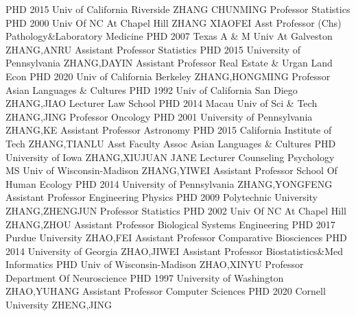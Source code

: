 \documentclass[
]{article}
\begin{document}
\textbar PHD 2015 Univ of California Riverside \textbar{} 
\textbar ZHANG CHUNMING \textbar Professor \textbar Statistics
\textbar PHD 2000 Univ Of NC At Chapel Hill \textbar{} 
\textbar ZHANG XIAOFEI \textbar Asst Professor (Chs)
\textbar Pathology\&Laboratory Medicine \textbar PHD 2007 Texas A \& M
Univ At Galveston \textbar{}  \textbar ZHANG,ANRU
\textbar Assistant Professor \textbar Statistics \textbar PHD 2015
University of Pennsylvania \textbar{}  \textbar ZHANG,DAYIN
\textbar Assistant Professor \textbar Real Estate \& Urgan Land Econ
\textbar PHD 2020 Univ of California Berkeley \textbar{} 
\textbar ZHANG,HONGMING \textbar Professor \textbar Asian Languages \&
Cultures \textbar PHD 1992 Univ of California San Diego \textbar{}
 \textbar ZHANG,JIAO \textbar Lecturer \textbar Law School
\textbar PHD 2014 Macau Univ of Sci \& Tech \textbar{} 
\textbar ZHANG,JING \textbar Professor \textbar Oncology \textbar PHD
2001 University of Pennsylvania \textbar{} 
\textbar ZHANG,KE \textbar Assistant Professor \textbar Astronomy
\textbar PHD 2015 California Institute of Tech \textbar{} 
\textbar ZHANG,TIANLU \textbar Asst Faculty Assoc \textbar Asian
Languages \& Cultures \textbar PHD University of Iowa \textbar{}
 \textbar ZHANG,XIUJUAN JANE \textbar Lecturer
\textbar Counseling Psychology \textbar MS Univ of Wisconsin-Madison
\textbar{}  \textbar ZHANG,YIWEI \textbar Assistant
Professor \textbar School Of Human Ecology \textbar PHD 2014 University
of Pennsylvania \textbar{}  \textbar ZHANG,YONGFENG
\textbar Assistant Professor \textbar Engineering Physics \textbar PHD
2009 Polytechnic University \textbar{} 
\textbar ZHANG,ZHENGJUN \textbar Professor \textbar Statistics
\textbar PHD 2002 Univ Of NC At Chapel Hill \textbar{} 
\textbar ZHANG,ZHOU \textbar Assistant Professor \textbar Biological
Systems Engineering \textbar PHD 2017 Purdue University \textbar{}
 \textbar ZHAO,FEI \textbar Assistant Professor
\textbar Comparative Biosciences \textbar PHD 2014 University of Georgia
\textbar{}  \textbar ZHAO,JIWEI \textbar Assistant Professor
\textbar Biostatistics\&Med Informatics \textbar PHD Univ of
Wisconsin-Madison \textbar{}  \textbar ZHAO,XINYU
\textbar Professor \textbar Department Of Neuroscience \textbar PHD 1997
University of Washington \textbar{}  \textbar ZHAO,YUHANG
\textbar Assistant Professor \textbar Computer Sciences \textbar PHD
2020 Cornell University \textbar{}  \textbar ZHENG,JING
\end{document}
